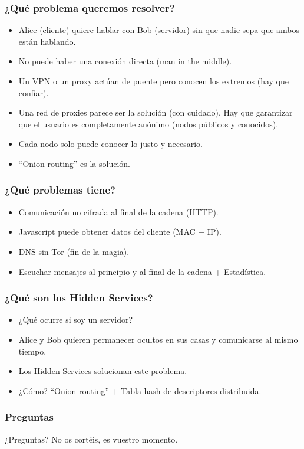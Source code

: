 \documentclass[spanish, a4paper, 12pt, final, slideColor, nototal, colorBG, pdf, noaccumulate, darkblue] {beamer}
\begin{document}
\begin{frame}
    \frametitle{¿Qué problema queremos resolver?}
    \begin{itemize}
    \item Alice (cliente) quiere hablar con Bob (servidor) sin que nadie sepa que ambos están hablando.
    \item No puede haber una conexión directa (man in the middle).
    \item Un VPN o un proxy actúan de puente pero conocen los extremos (hay que confiar).
    \item Una red de proxies parece ser la solución (con cuidado). Hay que garantizar que el usuario es completamente anónimo (nodos públicos y conocidos).
    \item Cada nodo solo puede conocer lo justo y necesario.
    \item ``Onion routing'' es la solución.
    \end{itemize}
\end{frame}
\begin{frame}
    \frametitle{¿Qué problemas tiene?}
    \begin{itemize}
    \item Comunicación no cifrada al final de la cadena (HTTP).
    \item Javascript puede obtener datos del cliente (MAC + IP).
    \item DNS sin Tor (fin de la magia).
    \item Escuchar mensajes al principio y al final de la cadena + Estadística.
    \end{itemize}
\end{frame}
\begin{frame}
    \frametitle{¿Qué son los Hidden Services?}
    \begin{itemize}
    \item ¿Qué ocurre si soy un servidor?
    \item Alice y Bob quieren permanecer ocultos en sus casas y comunicarse al mismo tiempo.
    \item Los Hidden Services solucionan este problema.
    \item ¿Cómo? ``Onion routing'' + Tabla hash de descriptores distribuida.
    \end{itemize}
\end{frame}
\begin{frame}
    \frametitle{Preguntas}
    \center ¿Preguntas? No os cortéis, es vuestro momento.
\end{frame}
\end{document}
